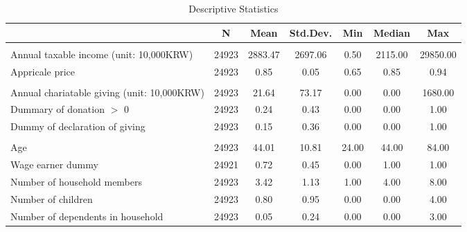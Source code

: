 \begin{table}

\caption{Descriptive Statistics\label{tab:summary-covariate}}
\centering
\fontsize{8}{10}\selectfont
\begin{threeparttable}
\begin{tabular}[t]{lcccccc}
\toprule
  & N & Mean & Std.Dev. & Min & Median & Max\\
\midrule
\addlinespace[0.3em]
\multicolumn{7}{l}{\textit{Income and giving price}}\\
\hspace{1em}Annual taxable income (unit: 10,000KRW) & 24923 & \num{2883.47} & \num{2697.06} & \num{0.50} & \num{2115.00} & \num{29850.00}\\
\hspace{1em}Appricale price & 24923 & \num{0.85} & \num{0.05} & \num{0.65} & \num{0.85} & \num{0.94}\\
\addlinespace[0.3em]
\multicolumn{7}{l}{\textit{Charitable giving}}\\
\hspace{1em}Annual chariatable giving (unit: 10,000KRW) & 24923 & \num{21.64} & \num{73.17} & \num{0.00} & \num{0.00} & \num{1680.00}\\
\hspace{1em}Dummary of donation $>$ 0 & 24923 & \num{0.24} & \num{0.43} & \num{0.00} & \num{0.00} & \num{1.00}\\
\hspace{1em}Dummy of declaration of giving & 24923 & \num{0.15} & \num{0.36} & \num{0.00} & \num{0.00} & \num{1.00}\\
\addlinespace[0.3em]
\multicolumn{7}{l}{\textit{Demographics}}\\
\hspace{1em}Age & 24923 & \num{44.01} & \num{10.81} & \num{24.00} & \num{44.00} & \num{84.00}\\
\hspace{1em}Wage earner dummy & 24921 & \num{0.72} & \num{0.45} & \num{0.00} & \num{1.00} & \num{1.00}\\
\hspace{1em}Number of household members & 24923 & \num{3.42} & \num{1.13} & \num{1.00} & \num{4.00} & \num{8.00}\\
\hspace{1em}Number of children & 24923 & \num{0.80} & \num{0.95} & \num{0.00} & \num{0.00} & \num{4.00}\\
\hspace{1em}Number of dependents in household & 24923 & \num{0.05} & \num{0.24} & \num{0.00} & \num{0.00} & \num{3.00}\\

\end{tabular}
\end{threeparttable}
\end{table}

